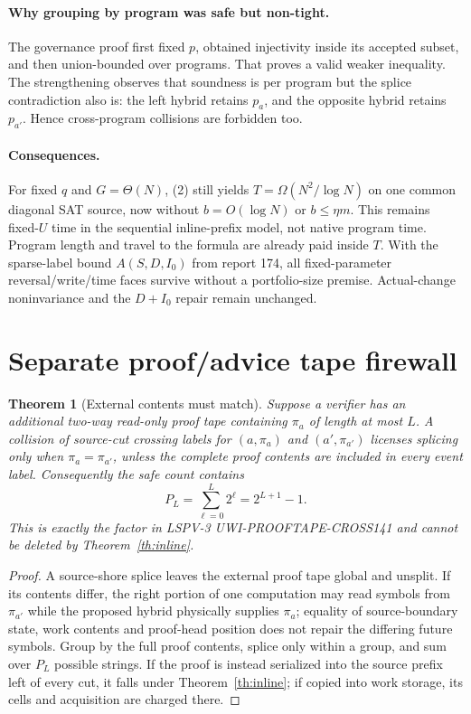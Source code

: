 \documentclass[11pt]{article}
\newtheorem{theorem}{Theorem}
\begin{document}
\paragraph{Why grouping by program was safe but non-tight.}
The governance proof first fixed $p$, obtained injectivity inside its accepted subset, and then union-bounded over programs.  That proves a valid weaker inequality.  The strengthening observes that soundness is per program but the splice contradiction also is: the left hybrid retains $p_a$, and the opposite hybrid retains $p_{a'}$.  Hence cross-program collisions are forbidden too.

\paragraph{Consequences.}
For fixed $q$ and $G=\Theta(N)$, (2) still yields
$T=\Omega(N^2/\log N)$ on one common diagonal SAT source, now without $b=O(\log N)$ or $b\le\eta m$.  This remains fixed-$U$ time in the sequential inline-prefix model, not native program time.  Program length and travel to the formula are already paid inside $T$.  With the sparse-label bound $A(S,D,I_0)$ from report 174, all fixed-parameter reversal/write/time faces survive without a portfolio-size premise.  Actual-change noninvariance and the $D+I_0$ repair remain unchanged.

\section{Separate proof/advice tape firewall}
\begin{theorem}[External contents must match]\label{th:proof}
Suppose a verifier has an additional two-way read-only proof tape containing $\pi_a$ of length at most $L$.  A collision of source-cut crossing labels for $(a,\pi_a)$ and $(a',\pi_{a'})$ licenses splicing only when $\pi_a=\pi_{a'}$, unless the complete proof contents are included in every event label.  Consequently the safe count contains
\[
        P_L=\sum_{\ell=0}^{L}2^\ell=2^{L+1}-1.       \tag{4}
\]
This is exactly the factor in LSPV-3 UWI-PROOFTAPE-CROSS141 and cannot be deleted by Theorem~\ref{th:inline}.
\end{theorem}
\begin{proof}
A source-shore splice leaves the external proof tape global and unsplit.  If its contents differ, the right portion of one computation may read symbols from $\pi_{a'}$ while the proposed hybrid physically supplies $\pi_a$; equality of source-boundary state, work contents and proof-head position does not repair the differing future symbols.  Group by the full proof contents, splice only within a group, and sum over $P_L$ possible strings.  If the proof is instead serialized into the source prefix left of every cut, it falls under Theorem~\ref{th:inline}; if copied into work storage, its cells and acquisition are charged there.
\end{proof}
\end{document}
